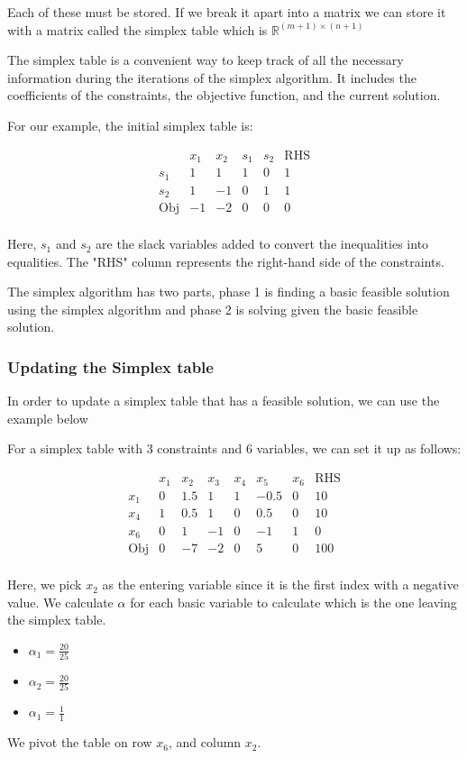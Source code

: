 Each of these must be stored.
If we break it apart into a matrix we can store it with a matrix called the simplex table which is $\mathbb{R}^{(m+1)\times (n+1)}$

The simplex table is a convenient way to keep track of all the necessary information during the iterations of the simplex algorithm. It includes the coefficients of the constraints, the objective function, and the current solution.

For our example, the initial simplex table is:

\[
\begin{array}{c|cccc|c}
 & x_1 & x_2 & s_1 & s_2 & \text{RHS} \\
\hline
s_1 & 1 & 1 & 1 & 0 & 1 \\
s_2 & 1 & -1 & 0 & 1 & 1 \\
\hline
\text{Obj} & -1 & -2 & 0 & 0 & 0 \\
\end{array}
\]

Here, $s_1$ and $s_2$ are the slack variables added to convert the inequalities into equalities. The "RHS" column represents the right-hand side of the constraints.

The simplex algorithm has two parts, phase 1 is finding a basic feasible solution using the simplex algorithm and phase 2 is solving given the basic feasible solution.
\subsubsection{Updating the Simplex table}
In order to update a simplex table that has a feasible solution, we can use the example below

For a simplex table with 3 constraints and 6 variables, we can set it up as follows:

\[ 
\begin{array}{c|ccccccc}
 & x_1 & x_2 & x_3 & x_4 & x_5 & x_6 & \text{RHS} \\
\hline
x_1 & 0 & 1.5 & 1 & 1 & -0.5 & 0 & 10 \\
x_4 & 1 & 0.5 & 1 & 0 & 0.5 & 0 &  10 \\
x_6 & 0 & 1 & -1 & 0 & -1 & 1 & 0 \\
\hline
\text{Obj} & 0 & -7 & -2 & 0 & 5 & 0 & 100 \\
\end{array}
\]

Here, we pick $x_2$ as the entering variable since it is the first index with a negative value.
We calculate $\alpha$ for each basic variable to calculate which is the one leaving the simplex table.
\begin{itemize}
  \item $\alpha_1 = \frac{20}{25}$
  \item $\alpha_2 = \frac{20}{25}$
  \item $\alpha_1 = \frac{1}{1}$
\end{itemize}
We pivot the table on row $x_6$, and column $x_2$.